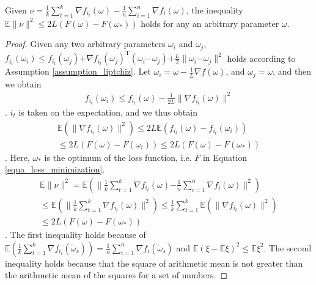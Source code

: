 \documentclass[letterpaper]{article}
\begin{document}
\begin{Lemma}
\label{lemma_nu}
Given $\nu = \frac{1}{k}\sum\limits_{t=1}^k  \nabla f_{i_t}(\omega) - \frac{1}{n}\sum\limits_{i=1}^n \nabla f_i(\omega)$, the inequality 
$\mathbb{E}\parallel \nu  \parallel^2 \le 2L(F(\omega) - F(\omega_\ast))$ holds for any an arbitrary parameter $\omega$.
\end{Lemma}
\begin{proof}
Given any two arbitrary parameters $\omega_i$ and $\omega_j$,  $f_{i_t}(\omega_i)\le f_{i_t}(\omega_j)\mathrm{+}\nabla f_{i_t}(\omega_j)^\mathrm{T} (\omega_i\mathrm{-}\omega_j)\mathrm{+}\frac{L}{2}\parallel \omega_i\mathrm{-}\omega_j\parallel^2$ holds according to Assumption  \ref{assumption_liptchiz}. Let $\omega_i = \omega  - \frac{1}{L}\nabla f(\omega)$, and $\omega_j = \omega$, and then we obtain
\begin{equation}
\begin{array}{ll}
f_{i_t}(\omega_i) \le f_{i_t}(\omega)-\frac{1}{2L}\parallel  \nabla f_{i_t}(\omega)   \parallel^2
\end{array} 
\end{equation}.  $i_{t}$ is taken on the expectation, and we thus obtain
\begin{equation}
\begin{array}{ll}
\mathbb{E}\left(\parallel  \nabla f_{i_t}(\omega)   \parallel^2 \right) \le 2L \mathbb{E}\left( f_{i_t}(\omega) - f_{i_t}(\omega_i) \right)   \\
\le 2L (F(\omega) - F(\omega_i) )  \le 2L (F(\omega) - F(\omega_\ast))
\end{array} 
\end{equation}. Here, $\omega_\ast$ is the optimum of the loss function, i.e. $F$ in Equation \ref{equa_loss_minimization}.
\begin{equation}
\begin{array}{ll}
\mathbb{E}\parallel \nu  \parallel^2 
= \mathbb{E}\left( \parallel \frac{1}{k}\sum\limits_{t=1}^k  \nabla f_{i_t}(\omega) \mathrm{-} \frac{1}{n}\sum\limits_{i=1}^n \nabla f_i(\omega) \parallel^2  \right)    \\
\le \mathbb{E}\left(  \parallel  \frac{1}{k}\sum\limits_{t=1}^k \nabla f_{i_t}(\omega) \parallel^2   \right )    
\le \frac{1}{k} \sum\limits_{t=1}^k \mathbb{E}\left ( \parallel \nabla f_{i_t} (\omega) \parallel^2   \right)   \\
\le 2L(F(\omega) - F(\omega_\ast))
\end{array} 
\end{equation}. The first inequality holds because of $\mathbb{E}(\frac{1}{k}\sum\limits_{t=1}^k \nabla f_{i_t}(\tilde{\omega}_s)) = \frac{1}{n}\sum\limits_{i=1}^n \nabla f_i(\tilde{\omega}_s)$ and $\mathbb{E}(\xi-\mathbb{E}\xi)^2\le\mathbb{E}\xi^2$. The second inequality holds because that the square of arithmetic mean   is not greater than the arithmetic mean of the squares for a set of numbers.
\end{proof}
\end{document}
